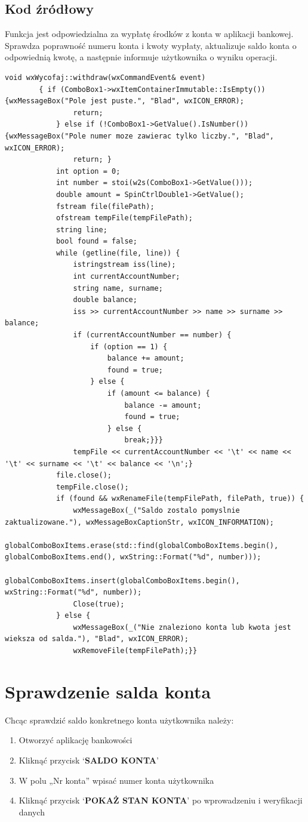 \documentclass[a4paper,12pt]{article}
\begin{document}
	\subsection{Kod źródłowy}
	Funkcja jest odpowiedzialna za wypłatę środków z konta w aplikacji bankowej. Sprawdza poprawność numeru konta i kwoty wypłaty, aktualizuje saldo konta o odpowiednią kwotę, a następnie informuje użytkownika o wyniku operacji.
	\begin{lstlisting}
void wxWycofaj::withdraw(wxCommandEvent& event)
		{ if (ComboBox1->wxItemContainerImmutable::IsEmpty()) {wxMessageBox("Pole jest puste.", "Blad", wxICON_ERROR);
				return;
			} else if (!ComboBox1->GetValue().IsNumber()) {wxMessageBox("Pole numer moze zawierac tylko liczby.", "Blad", wxICON_ERROR);
				return; }
			int option = 0;
			int number = stoi(w2s(ComboBox1->GetValue()));
			double amount = SpinCtrlDouble1->GetValue();
			fstream file(filePath);
			ofstream tempFile(tempFilePath);
			string line;
			bool found = false;
			while (getline(file, line)) {
				istringstream iss(line);
				int currentAccountNumber;
				string name, surname;
				double balance;
				iss >> currentAccountNumber >> name >> surname >> balance;
				if (currentAccountNumber == number) {
					if (option == 1) {
						balance += amount;
						found = true;
					} else {
						if (amount <= balance) {
							balance -= amount;
							found = true;
						} else {
							break;}}}
				tempFile << currentAccountNumber << '\t' << name << '\t' << surname << '\t' << balance << '\n';}
			file.close();
			tempFile.close();
			if (found && wxRenameFile(tempFilePath, filePath, true)) {
				wxMessageBox(_("Saldo zostalo pomyslnie zaktualizowane."), wxMessageBoxCaptionStr, wxICON_INFORMATION);
				globalComboBoxItems.erase(std::find(globalComboBoxItems.begin(), globalComboBoxItems.end(), wxString::Format("%d", number)));
				globalComboBoxItems.insert(globalComboBoxItems.begin(), wxString::Format("%d", number));
				Close(true);
			} else {
				wxMessageBox(_("Nie znaleziono konta lub kwota jest wieksza od salda."), "Blad", wxICON_ERROR);
				wxRemoveFile(tempFilePath);}}
	\end{lstlisting}

	\section{Sprawdzenie salda konta}
	Chcąc sprawdzić saldo konkretnego konta użytkownika należy:
	\begin{enumerate}
		\item Otworzyć aplikację bankowości
		\item Kliknąć przycisk ‘\textbf{SALDO KONTA}’
		\item W polu „Nr konta” wpisać numer konta użytkownika
		\item Kliknąć przycisk ‘\textbf{POKAŻ STAN KONTA}’ po wprowadzeniu i weryfikacji danych
	\end{enumerate}
\end{document}
